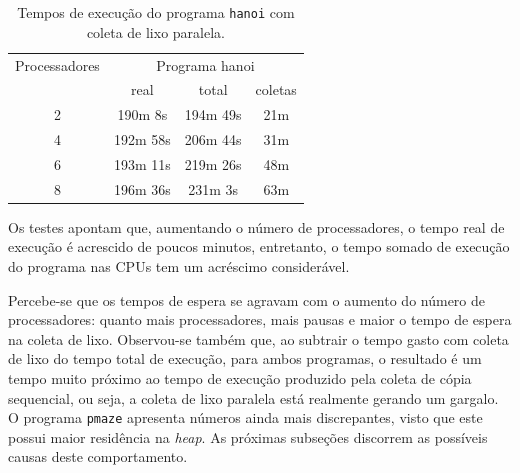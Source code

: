 \documentclass[ccc, pg2]{esinucpel}
\begin{document}
\begin{table}[h]
\centering
	\begin{tabular}{c|c|c|c}
	\hline
	Processadores	& \multicolumn{3}{c}{Programa hanoi} \\
	\cline{2-4}
								& real			& total			& coletas \\
	\hline
	2							&	190m 8s		&	194m 49s 	& 21m \\
	\hline
	4							& 192m 58s	& 206m 44s 	& 31m \\
	\hline
	6							& 193m 11s	& 219m 26s 	& 48m \\
	\hline
	8							& 196m 36s	& 231m 3s 	& 63m \\
	\hline
	\end{tabular}
\caption{Tempos de execução do programa {\tt hanoi} com coleta de lixo paralela.}
\label{tab:res2}
\end{table}

Os testes apontam que, aumentando o número de processadores, o tempo real de execução é acrescido de poucos minutos, entretanto, o tempo somado de execução do programa nas CPUs tem um acréscimo considerável.

Percebe-se que os tempos de espera se agravam com o aumento do número de processadores: quanto mais processadores, mais pausas e maior o tempo de espera na coleta de lixo. Observou-se também que, ao subtrair o tempo gasto com coleta de lixo do tempo total de execução, para ambos programas, o resultado é um tempo muito próximo ao tempo de execução produzido pela coleta de cópia sequencial, ou seja, a coleta de lixo paralela está realmente gerando um gargalo. O programa {\tt pmaze} apresenta números ainda mais discrepantes, visto que este possui maior residência na {\it heap}. As próximas subseções discorrem as possíveis causas deste comportamento.

\end{document}
